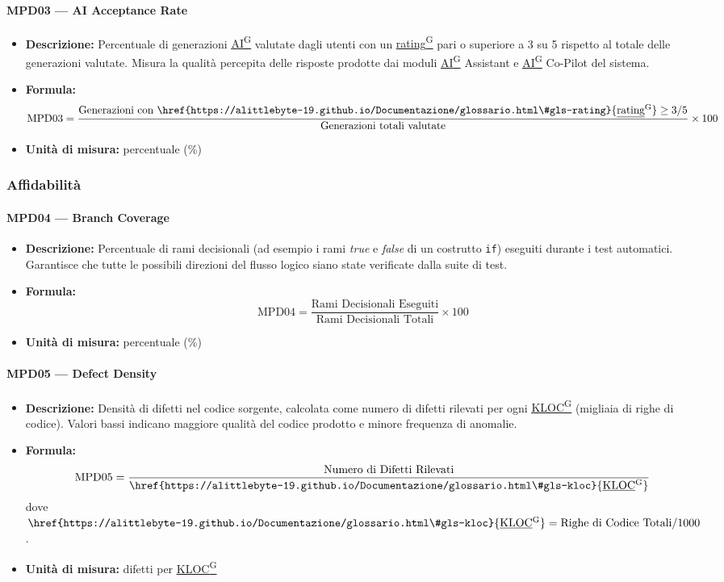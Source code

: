 \documentclass[a4paper,12pt]{article}
\providecommand{\glslink}[2]{\href{https://alittlebyte-19.github.io/Documentazione/glossario.html\#gls-#1}{\underline{#2}\textsuperscript{\scriptsize G}}}
\begin{document}
\paragraph{MPD03 --- AI Acceptance Rate}
\begin{itemize}
    \item \textbf{Descrizione:} Percentuale di generazioni \glslink{intelligenza-artificiale-ai}{AI} valutate dagli utenti con un \glslink{rating}{rating} pari o superiore a 3 su 5 rispetto al totale delle generazioni valutate. Misura la qualità percepita delle risposte prodotte dai moduli \glslink{intelligenza-artificiale-ai}{AI} Assistant e \glslink{intelligenza-artificiale-ai}{AI} Co-Pilot del sistema.
    \item \textbf{Formula:}
    $$\text{MPD03} = \frac{\text{Generazioni con \glslink{rating}{rating}} \geq 3/5}{\text{Generazioni totali valutate}} \times 100$$
    \item \textbf{Unità di misura:} percentuale (\%)
\end{itemize}

\subsubsection{Affidabilità}

\paragraph{MPD04 --- Branch Coverage}
\begin{itemize}
    \item \textbf{Descrizione:} Percentuale di rami decisionali (ad esempio i rami \textit{true} e \textit{false} di un costrutto \texttt{if}) eseguiti durante i test automatici. Garantisce che tutte le possibili direzioni del flusso logico siano state verificate dalla suite di test.
    \item \textbf{Formula:}
    $$\text{MPD04} = \frac{\text{Rami Decisionali Eseguiti}}{\text{Rami Decisionali Totali}} \times 100$$
    \item \textbf{Unità di misura:} percentuale (\%)
\end{itemize}

\paragraph{MPD05 --- Defect Density}
\begin{itemize}
    \item \textbf{Descrizione:} Densità di difetti nel codice sorgente, calcolata come numero di difetti rilevati per ogni \glslink{kloc}{KLOC} (migliaia di righe di codice). Valori bassi indicano maggiore qualità del codice prodotto e minore frequenza di anomalie.
    \item \textbf{Formula:}
    $$\text{MPD05} = \frac{\text{Numero di Difetti Rilevati}}{\text{\glslink{kloc}{KLOC}}}$$
    dove $\text{\glslink{kloc}{KLOC}} = \text{Righe di Codice Totali} / 1000$.
    \item \textbf{Unità di misura:} difetti per \glslink{kloc}{KLOC}
\end{itemize}
\end{document}
